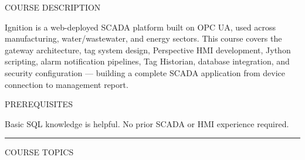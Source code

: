 \documentclass[10pt]{article}
\begin{document}

\vspace{0.70in}

{\small\sffamily\color{ogray}\MakeUppercase{Course Description}}
\smallskip

{\small Ignition is a web-deployed SCADA platform built on OPC UA, used across manufacturing, water/wastewater, and energy sectors. This course covers the gateway architecture, tag system design, Perspective HMI development, Jython scripting, alarm notification pipelines, Tag Historian, database integration, and security configuration — building a complete SCADA application from device connection to management report.}

\smallskip
{\small\sffamily\color{ogray}\MakeUppercase{Prerequisites}}
\smallskip

{\small Basic SQL knowledge is helpful. No prior SCADA or HMI experience required.}

\smallskip
{\color{onavy}\rule{\linewidth}{1.2pt}}
\smallskip
{\small\sffamily\color{ogray}\MakeUppercase{Course Topics}}
\smallskip
\end{document}
